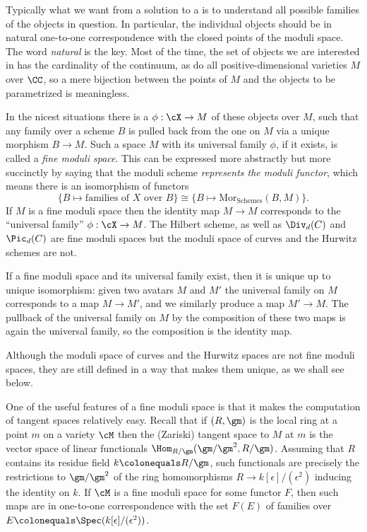 Typically what we want from a solution to a
%
is to
understand all possible families of the objects
in question. In particular, the individual objects should be in natural
%
one-to-one correspondence with the closed points of the
moduli space.  The word \emph{natural} is the key. Most of the time,
the set of objects we are interested in has
the cardinality of the continuum,
as do all positive-dimensional varieties $M$ over $\CC$, so a mere
bijection between the points of $M$ and the objects to be parametrized
is meaningless.

In the nicest situations there is a
%
$\phi:
\cX\to M$ of these objects over $M$,
such that any family over a scheme $B$  is pulled back from the one on
$M$ via a unique morphism $B\to M.$  Such a space $M$ with its universal
family $\phi$, if it exists, is called a \emph{fine moduli space}. This
%
%
can be expressed more abstractly but more succinctly by saying that the
moduli scheme \emph{represents the moduli functor}, which means there
is an isomorphism of functors
$$
\{ B \mapsto \text{families of } X \text{ over } B \} \cong \{ B\mapsto
\mathrm{{Mor}}_{\mathrm{ Schemes}}(B, M) \}.
$$
If $M$ is a fine moduli space then the identity map $M\to M$ corresponds
to the ``universal family'' $\phi: \cX \to M$.
The Hilbert scheme, as well as $\Div_d(C)$ and $\Pic_d(C)$ are fine moduli
spaces but the moduli space of curves
and the Hurwitz schemes are not.

If a fine moduli space and its universal family exist, then it is unique
up to unique isomorphism: given two avatars $M$ and $M'$
the universal family on $M$ corresponds to a map $M\to M'$, and we
similarly produce a map $M'\to M$. The pullback of the universal family
on $M$ by the composition of these two maps is again the universal family,
so the composition is the identity map.

Although the moduli space of curves and the Hurwitz spaces are not fine
moduli spaces, they are still defined
in a way that makes them unique, as we shall see below.

\def\eps{{\epsilon}}
One of the useful features of a fine moduli space is that it makes the
computation of tangent spaces relatively easy.
%
%
Recall that if $(R,\gm)$ is the local ring at a point $m$ on a variety
$\cM$ then the (Zariski) tangent
space to $M$ at $m$ is the vector space of linear functionals
$\Hom_{R/\gm}(\gm/\gm^2, R/\gm)$.   Assuming that
$R$ contains its residue field $k \colonequals  R/\gm$, such functionals
are precisely the restrictions to $\gm/\gm^2$ of the ring homomorphisms
$R \to k[\eps]/(\eps^2)$ inducing the identity on $k$.
 If $\cM$ is a fine moduli space for some functor $F$, then such maps
 are in one-to-one correspondence
with the set $F(E)$ of families over $E \colonequals
\Spec(k[\eps]/(\eps^2))$.

